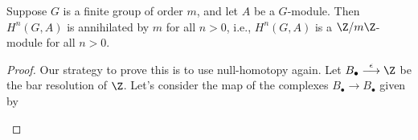 \begin{theorem}
    Suppose $G$ is a finite group of order $m$, and let $A$ be a $G$-module.
    Then $H^n(G,A)$ is annihilated by $m$ for all $n>0$,
    i.e., $H^n(G, A)$ is a $\Z/m\Z$-module for all $n>0$.
\end{theorem}
\begin{proof}
    Our strategy to prove this is to use null-homotopy again.
    Let $B_\bullet\overset{\epsilon}{\longrightarrow} \Z$ be the bar resolution of $\Z$.
    Let's consider the map of the complexes $B_\bullet \to B_\bullet$ given by
    \begin{figure}[ht]
        \centering
    \end{figure}


\end{proof}
